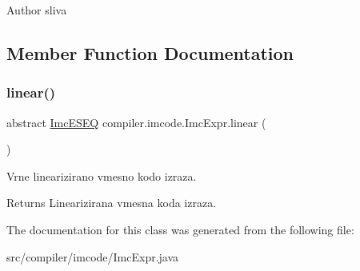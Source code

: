 \begin{DoxyAuthor}{Author}
sliva 
\end{DoxyAuthor}


\subsection{Member Function Documentation}
\mbox{\label{classcompiler_1_1imcode_1_1_imc_expr_adbdc14b453fc4434762e1a8f0d820e20}} 
\subsubsection{\texorpdfstring{linear()}{linear()}}
{\footnotesize\ttfamily abstract \hyperlink{classcompiler_1_1imcode_1_1_imc_e_s_e_q}{Imc\+E\+S\+EQ} compiler.\+imcode.\+Imc\+Expr.\+linear (\begin{DoxyParamCaption}{ }\end{DoxyParamCaption})\hspace{0.3cm}{\ttfamily [abstract]}}

Vrne linearizirano vmesno kodo izraza.

\begin{DoxyReturn}{Returns}
Linearizirana vmesna koda izraza. 
\end{DoxyReturn}


The documentation for this class was generated from the following file\+:\begin{DoxyCompactItemize}
\item 
src/compiler/imcode/Imc\+Expr.\+java\end{DoxyCompactItemize}
